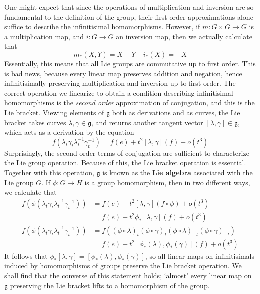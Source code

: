 One might expect that since the operations of multiplication and inversion are so fundamental to the definition of the group, their first order approximations alone suffice to describe the infinitisimal homomorphisms. However, if $m: G \times G \to G$ is a multiplication map, and $i: G \to G$ an inversion map, then we actually calculate that
%
\[ m_*(X,Y) = X + Y\ \ \ \ \ i_*(X) = -X \]
%
Essentially, this means that all Lie groups are commutative up to first order. This is bad news, because every linear map preserves addition and negation, hence infinitisimally preserving multiplication and inversion up to first order. The correct operation we linearize to obtain a condition describing infinitisimal homomorphisms is the {\it second order} approximation of conjugation, and this is the Lie bracket. Viewing elements of $\mathfrak{g}$ both as derivations and as curves, the Lie bracket takes curves $\lambda, \gamma \in \mathfrak{g}$, and returns another tangent vector $[\lambda, \gamma] \in \mathfrak{g}$, which acts as a derivation by the equation
%
\[ f(\lambda_t \gamma_t \lambda^{-1}_t \gamma^{-1}_t) = f(e) + t^2 [\lambda, \gamma](f) + o(t^3) \]
%
Surprisingly, the second order terms of conjugation are sufficient to characterize the Lie group operation. Because of this, the Lie bracket operation is essential. Together with this operation, $\mathfrak{g}$ is known as the {\bf Lie algebra} associated with the Lie group $G$. If $\phi: G \to H$ is a group homomorphism, then in two different ways, we calculate that
%
\begin{align*}
     f(\phi(\lambda_t \gamma_t \lambda^{-1}_t \gamma^{-1}_t)) &= f(e) + t^2[\lambda, \gamma](f \circ \phi) + o(t^3)\\
     &= f(e) + t^2  \phi_*[\lambda, \gamma] (f) + o(t^3)\\
    f(\phi(\lambda_t \gamma_t \lambda^{-1}_t \gamma^{-1}_t)) &= f((\phi \circ \lambda)_t (\phi \circ \gamma)_t (\phi \circ \lambda)_{-t} (\phi \circ \gamma)_{-t})\\
     &= f(e) + t^2 [\phi_*(\lambda), \phi_*(\gamma)](f) + o(t^3)
\end{align*}
%
It follows that $\phi_*[\lambda, \gamma] = [\phi_*(\lambda), \phi_*(\gamma)]$, so all linear maps on infinitisimals induced by homomorphisms of groups preserve the Lie bracket operation. We shall find that the converse of this statement holds; `almost' every linear map on $\mathfrak{g}$ preserving the Lie bracket lifts to a homomorphism of the group.


